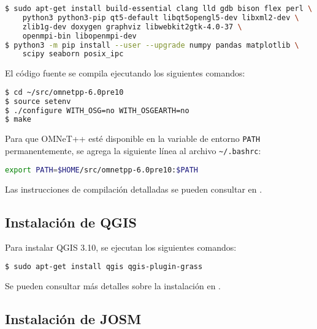 \begin{lstlisting}[language=bash]
$ sudo apt-get install build-essential clang lld gdb bison flex perl \
    python3 python3-pip qt5-default libqt5opengl5-dev libxml2-dev \
    zlib1g-dev doxygen graphviz libwebkit2gtk-4.0-37 \
    openmpi-bin libopenmpi-dev
$ python3 -m pip install --user --upgrade numpy pandas matplotlib \
    scipy seaborn posix_ipc
\end{lstlisting}

El código fuente se compila ejecutando los siguientes comandos:

\begin{lstlisting}[language=bash]
$ cd ~/src/omnetpp-6.0pre10
$ source setenv
$ ./configure WITH_OSG=no WITH_OSGEARTH=no
$ make
\end{lstlisting}

Para que OMNeT++ esté disponible en la variable de entorno
{\lstinline[language=bash]!PATH!} permanentemente, se agrega la siguiente línea
al archivo {\lstinline[language=bash]!~/.bashrc!}:

\begin{lstlisting}[language=bash]
export PATH=$HOME/src/omnetpp-6.0pre10:$PATH
\end{lstlisting}

Las instrucciones de compilación detalladas se pueden consultar en
\cite{CompilacionOMNeT}.

\subsection{Instalación de QGIS}
\label{subsec:instalacion_qgis}

Para instalar QGIS 3.10, se ejecutan los siguientes comandos:

\begin{lstlisting}[language=bash]
$ sudo apt-get install qgis qgis-plugin-grass
\end{lstlisting}

Se pueden consultar más detalles sobre la instalación en
\cite{InstalacionQGIS}.

\subsection{Instalación de JOSM}
\label{subsec:instalacion_josm}

